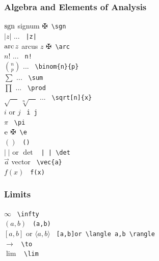 \subsubsection{Algebra and Elements of Analysis}
\begin{tabbing}
\mySymbols
 $ \mathrm{sgn} $                            \> signum              \>  $\maltese$\verb` \sgn ` \\
 $ |z|$                              \> ...                 \>  \verb` |z| ` \\
 $ \mathrm{arc}\,z$                          \> arcus $z$           \>  $\maltese$\verb` \arc ` \\
 $ n!$                               \> ...                 \>  \verb` n! ` \\
 $ \binom{n}{p}$                     \> ...                 \>  \verb` \binom{n}{p} ` \\
 $ \sum $                            \> ...                 \>  \verb` \sum  ` \\
 $ \prod $                           \> ...                 \>  \verb` \prod ` \\
 $ \sqrt{\quad}\;\sqrt[n]{\quad} $   \> ...                 \>  \verb` \sqrt[n]{x} ` \\
 $i$ or $j$                          \>                     \>  \verb` i j ` \\
 $\pi $                              \>                     \>  \verb` \pi ` \\
 $\mathrm{e} $                               \>                     \>  $\maltese$\verb` \e ` \\
 $()$                                \>                     \>  \verb` () ` \\
 $|\;|$ or $\det$                    \>                     \>  \verb` | | \det` \\
 $\vec{a} $                          \> vector                    \> \verb` \vec{a} `\\
 $f(x)$                              \>                     \>  \verb` f(x) ` \\
\end{tabbing}

\subsubsection{Limits}
\begin{tabbing}
\mySymbols
 $\infty$                            \>                     \> \verb` \infty `  \\
 $(a,b)$                             \>                     \> \verb` (a,b) `  \\
 ${[a,b]}$ or $\langle a,b \rangle$  \>                     \> \verb` [a,b]or \langle a,b \rangle `  \\
 $\to $                              \>                     \> \verb` \to  `  \\
 $\lim $                             \>                     \> \verb` \lim `  \\
\end{tabbing}

